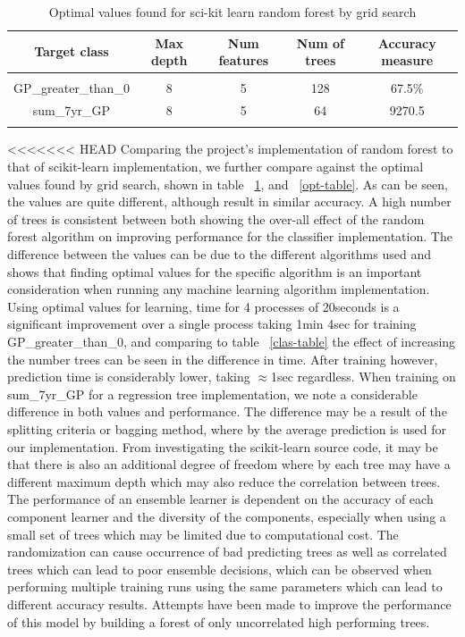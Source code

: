 \documentclass{article} %
\begin{document}
\begin{table}[h]
\caption{Optimal values found for sci-kit learn random forest by grid search}
\begin{center}
\begin{tabular}{ccccc}
{\bf Target class} &{\bf Max depth} &{\bf Num features} &{\bf Num of trees}&{\bf Accuracy measure}
\\ \hline \\
GP\_greater\_than\_0         &8	&5 &128 &67.5\%\\
sum\_7yr\_GP         &8	&5 &64 &9270.5\\
\label{scikit-table}
\end{tabular}
\end{center}
\end{table}

<<<<<<< HEAD
Comparing the project's implementation of random forest to that of scikit-learn implementation, we further compare against the optimal values found by grid search, shown in table ~\ref{scikit-table}, and ~\ref{opt-table}. As can be seen, the values are quite different, although result in similar accuracy. A high number of trees is consistent between both showing the over-all effect of the random forest algorithm on improving performance for the classifier implementation. The difference between the values can be due to the different algorithms used and shows that finding optimal values for the specific algorithm is an important consideration when running any machine learning algorithm implementation. Using optimal values for learning, time for 4 processes of 20seconds is a significant improvement over a single process taking 1min 4sec for training GP\_greater\_than\_0, and comparing to table ~\ref{clas-table} the effect of increasing the number trees can be seen in the difference in time. After training however, prediction time is considerably lower, taking $\approx$1sec regardless. When training on sum\_7yr\_GP for a regression tree implementation, we note a considerable difference in both values and performance. The difference may be a result of the splitting criteria or bagging method, where by the average prediction is used for our implementation. From investigating the scikit-learn source code, it may be that there is also an additional degree of freedom where by each tree may have a different maximum depth which may also reduce the correlation between trees. The performance of an ensemble learner is dependent on the accuracy of each component learner and the diversity of the components, especially when using a small set of trees which may be limited due to computational cost. The randomization can cause occurrence of bad predicting trees as well as correlated trees which can lead to poor ensemble decisions, which can be observed when performing multiple training runs using the same parameters which can lead to different accuracy results. Attempts have been made to improve the performance of this model by building a forest of only uncorrelated high performing trees. \cite{Bharathidason2014}
\end{document}
